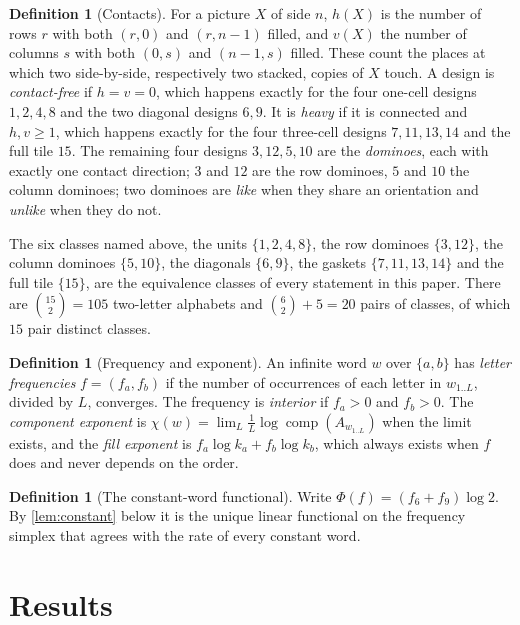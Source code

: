 \documentclass[11pt]{amsart}
\theoremstyle{definition}
\newtheorem{definition}[theorem]{Definition}
\theoremstyle{remark}
\DeclareMathOperator{\comp}{comp}
\begin{document}
\begin{definition}[Contacts]
\label{def:contact}
For a picture $X$ of side $n$, $h(X)$ is the number of rows $r$ with both $(r,0)$ and $(r, n-1)$ filled, and $v(X)$ the number of columns $s$ with both $(0,s)$ and $(n-1,s)$ filled. These count the places at which two side-by-side, respectively two stacked, copies of $X$ touch. A design is \emph{contact-free} if $h = v = 0$, which happens exactly for the four one-cell designs $1, 2, 4, 8$ and the two diagonal designs $6, 9$. It is \emph{heavy} if it is connected and $h, v \ge 1$, which happens exactly for the four three-cell designs $7, 11, 13, 14$ and the full tile $15$. The remaining four designs $3, 12, 5, 10$ are the \emph{dominoes}, each with exactly one contact direction; $3$ and $12$ are the row dominoes, $5$ and $10$ the column dominoes; two dominoes are \emph{like} when they share an orientation and \emph{unlike} when they do not.
\end{definition}

The six classes named above, the units $\{1,2,4,8\}$, the row dominoes $\{3,12\}$, the column dominoes $\{5,10\}$, the diagonals $\{6,9\}$, the gaskets $\{7,11,13,14\}$ and the full tile $\{15\}$, are the equivalence classes of every statement in this paper. There are $\binom{15}{2} = 105$ two-letter alphabets and $\binom{6}{2} + 5 = 20$ pairs of classes, of which $15$ pair distinct classes.

\begin{definition}[Frequency and exponent]
\label{def:freq}
An infinite word $w$ over $\{a,b\}$ has \emph{letter frequencies} $f = (f_a, f_b)$ if the number of occurrences of each letter in $w_{1..L}$, divided by $L$, converges. The frequency is \emph{interior} if $f_a > 0$ and $f_b > 0$. The \emph{component exponent} is $\chi(w) = \lim_L \tfrac1L \log\comp(A_{w_{1..L}})$ when the limit exists, and the \emph{fill exponent} is $f_a \log k_a + f_b \log k_b$, which always exists when $f$ does and never depends on the order.
\end{definition}

\begin{definition}[The constant-word functional]
\label{def:phi}
Write $\Phi(f) = (f_6 + f_9)\log 2$. By \cref{lem:constant} below it is the unique linear functional on the frequency simplex that agrees with the rate of every constant word.
\end{definition}

\section{Results}
\label{sec:results}
\end{document}

